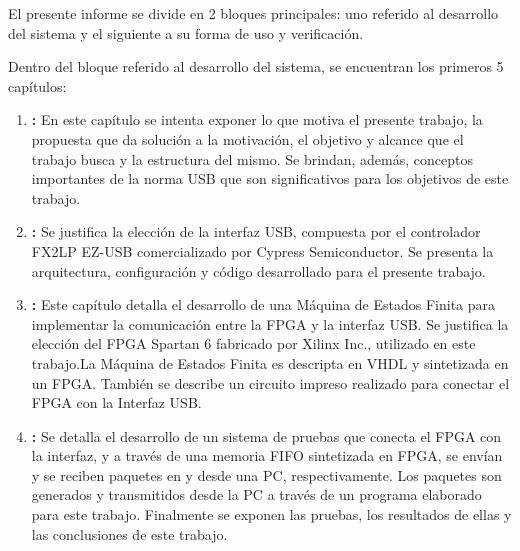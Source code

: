 El presente informe se divide en 2 bloques principales: uno referido al desarrollo del sistema y el siguiente a su forma de uso y verificación.

Dentro del bloque referido al desarrollo del sistema, se encuentran los primeros 5 capítulos:

\begin{enumerate}
	\item {\bf {}:} En este capítulo se intenta exponer lo que motiva el presente trabajo, la propuesta que da solución a la motivación, el objetivo y alcance que el trabajo busca y la estructura del mismo. Se brindan, además, conceptos importantes de la norma USB que son significativos para los objetivos de este trabajo.
	\item {\bf {}:} Se justifica la elección de la interfaz USB, compuesta por el controlador FX2LP EZ-USB comercializado por Cypress Semiconductor. Se presenta la arquitectura, configuración y código desarrollado para el presente trabajo. 
	\item {\bf {}:} Este capítulo detalla el desarrollo de una Máquina de Estados Finita para implementar la comunicación entre la FPGA y la interfaz USB. Se justifica la elección del FPGA Spartan 6 fabricado por Xilinx Inc., utilizado en este trabajo.La Máquina de Estados Finita es descripta en VHDL y sintetizada en un FPGA. También se describe un circuito impreso realizado para conectar el FPGA con la Interfaz USB.
	\item {\bf {}:} Se detalla el desarrollo de un sistema de pruebas que conecta el FPGA con la interfaz, y a través de una memoria FIFO sintetizada en FPGA, se envían y se reciben paquetes en y desde una PC, respectivamente. Los paquetes son generados y transmitidos desde la PC a través de un programa elaborado para este trabajo. Finalmente se exponen las pruebas, los resultados de ellas y las conclusiones de este trabajo.
\end{enumerate}